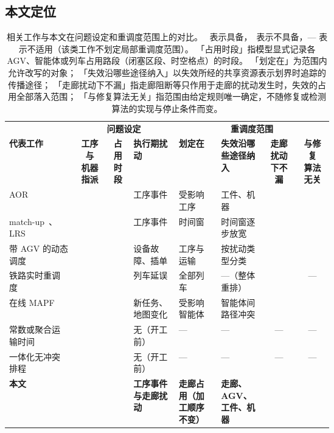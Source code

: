 \documentclass[manuscript,screen,review]{acmart}
\newcommand{\cmark}{\ding{51}}
\newcommand{\xmark}{\ding{55}}
\begin{document}
\subsection{本文定位}
\label{sec:rw_claim}

\begin{table}[t]
\centering
\caption{相关工作与本文在问题设定和重调度范围上的对比。
\cmark\ 表示具备，\xmark\ 表示不具备，— 表示不适用（该类工作不划定局部重调度范围）。
「占用时段」指模型显式记录各 AGV、智能体或列车占用路段（闭塞区段、时空格点）的时段。
「划定在」为范围内允许改写的对象；
「失效沿哪些途径纳入」以失效所经的共享资源表示划界时追踪的传播途径；
「走廊扰动下不漏」指走廊阻断等只作用于走廊的扰动发生时，失效的占用全部落入范围；
「与修复算法无关」指范围由给定规则唯一确定，不随修复或检测算法的实现与停止条件而变。}
\label{tab:position}
\small
\setlength{\tabcolsep}{3pt}
\begin{tabular}{@{}p{0.21\linewidth}ccp{0.14\linewidth}p{0.13\linewidth}p{0.14\linewidth}cc@{}}
\toprule
& \multicolumn{3}{c}{\textbf{问题设定}} & \multicolumn{4}{c}{\textbf{重调度范围}} \\
\cmidrule(lr){2-4}\cmidrule(l){5-8}
\textbf{代表工作} &
\makecell{\textbf{工序与}\\\textbf{机器指派}} &
\makecell{\textbf{占用}\\\textbf{时段}} &
\textbf{执行期扰动} &
\textbf{划定在} &
\textbf{失效沿哪些途径纳入} &
\makecell{\textbf{走廊扰动}\\\textbf{下不漏}} &
\makecell{\textbf{与修复}\\\textbf{算法无关}} \\
\midrule
AOR~\cite{subramaniam2003maor} &
\cmark & \xmark & 工序事件 & 受影响工序 & 工件、机器 & \xmark & \cmark \\
match-up~\cite{qiao2012single,salido2017rescheduling}、LRS~\cite{kuster2007local} &
\cmark & \xmark & 工序事件 & 时间窗 & 时间窗逐步放宽 & \xmark & \xmark \\
带 AGV 的动态调度~\cite{zhang2023energy,tang2026dynamic} &
\cmark & \xmark & 设备故障、插单 & 工序与运输 & 按扰动类型分类 & \xmark & \cmark \\
铁路实时重调度~\cite{mascis2002alternative,dariano2007branch} &
\xmark & \cmark & 列车延误 & 全部列车 & —（整体重排） & \cmark & — \\
在线 MAPF~\cite{svancara2019online,malka2024online} &
\xmark & \cmark & 新任务、地图变化 & 受影响智能体 & 智能体间路径冲突 & \cmark & \xmark \\
常数或聚合运输时间~\cite{meng2025cp,qin2026knowledge,jafarian2026integrated} &
\cmark & \xmark & 无（开工前） & — & — & — & — \\
一体化无冲突排程~\cite{vanos2026exact,sun2023integrated,li2026framework} &
\cmark & \cmark & 无（开工前） & — & — & — & — \\
\midrule
\textbf{本文} &
\cmark & \cmark & \textbf{工序事件与走廊扰动} & \textbf{走廊占用（加工顺序不变）} & \textbf{走廊、AGV、工件、机器} & \cmark & \cmark \\
\bottomrule
\end{tabular}
\end{table}
\end{document}
